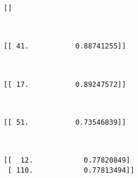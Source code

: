 \documentclass{article}
\begin{document}
    \begin{Verbatim}[commandchars=\\\{\}]
[]
    \end{Verbatim}

    \begin{center}
    \end{center}
    { \hspace*{\fill} \\}
    
    \begin{Verbatim}[commandchars=\\\{\}]
[[ 41.           0.88741255]]
    \end{Verbatim}

    \begin{center}
    \end{center}
    { \hspace*{\fill} \\}
    
    \begin{Verbatim}[commandchars=\\\{\}]
[[ 17.           0.89247572]]
    \end{Verbatim}

    \begin{center}
    \end{center}
    { \hspace*{\fill} \\}
    
    \begin{Verbatim}[commandchars=\\\{\}]
[[ 51.           0.73546839]]
    \end{Verbatim}

    \begin{center}
    \end{center}
    { \hspace*{\fill} \\}
    
    \begin{Verbatim}[commandchars=\\\{\}]
[[  12.            0.77820849]
 [ 110.            0.77813494]]
    \end{Verbatim}
\end{document}
